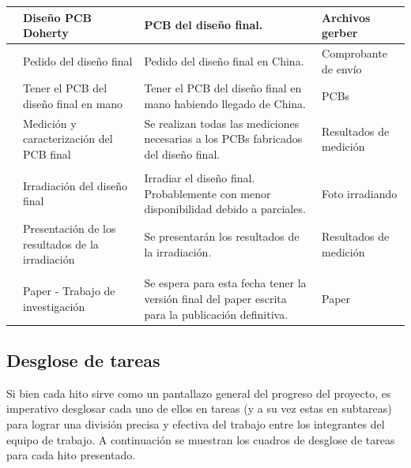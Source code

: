 \begin{xltabular}{\textwidth}{>{\centering\arraybackslash}p{0.4cm} X X p{2.5cm}}
     & Diseño PCB Doherty & PCB del diseño final. & Archivos gerber \\
    
     & Pedido del diseño final & Pedido del diseño final en China. & Comprobante de envío \\
    
     & Tener el PCB del diseño final en mano & Tener el PCB del diseño final en mano habiendo llegado de China. & PCBs \\
    
     & Medición y caracterización del PCB final & Se realizan todas las mediciones necesarias a los PCBs fabricados del diseño final. & Resultados de medición \\
    
    \hline
      \\
    
     & Irradiación del diseño final & Irradiar el diseño final. Probablemente con menor disponibilidad debido a parciales. & Foto irradiando \\
    
     & Presentación de los resultados de la irradiación & Se presentarán los resultados de la irradiación. & Resultados de medición \\
    
    \hline
      \\
    
     & Paper - Trabajo de investigación & Se espera para esta fecha tener la versión final del paper escrita para la publicación definitiva. & Paper \\

    \hline\hline
\end{xltabular}

\subsection{Desglose de tareas}
Si bien cada hito sirve como un pantallazo general del progreso del proyecto, es imperativo desglosar cada uno de ellos en tareas (y a su vez estas en subtareas) para lograr una división precisa y efectiva del trabajo entre los integrantes del equipo de trabajo. A continuación se muestran los cuadros de desglose de tareas para cada hito presentado.

